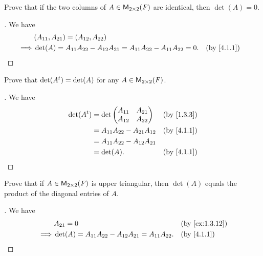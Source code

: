 \begin{ex}\label{ex:4.1.6}
  Prove that if the two columns of \(A \in \ms[2][2][\F]\) are identical, then \(\det(A) = 0\).
\end{ex}

\begin{proof}[]
  We have
  \begin{align*}
             & (A_{1 1}, A_{2 1}) = (A_{1 2}, A_{2 2})                                                              \\
    \implies & \det(A) = A_{1 1} A_{2 2} - A_{1 2} A_{2 1} = A_{1 1} A_{2 2} - A_{1 1} A_{2 2} = 0. &  & \by{4.1.1}
  \end{align*}
\end{proof}

\begin{ex}\label{ex:4.1.7}
  Prove that \(\det({A}^{t}) = \det(A)\) for any \(A \in \ms[2][2][\F]\).
\end{ex}

\begin{proof}[]
  We have
  \begin{align*}
    \det(\tp{A}) & = \det\begin{pmatrix}
                           A_{1 1} & A_{2 1} \\
                           A_{1 2} & A_{2 2}
                         \end{pmatrix}               &  & \by{1.3.3}   \\
                 & = A_{1 1} A_{2 2} - A_{2 1} A_{1 2} &  & \by{4.1.1} \\
                 & = A_{1 1} A_{2 2} - A_{1 2} A_{2 1}                 \\
                 & = \det(A).                          &  & \by{4.1.1}
  \end{align*}
\end{proof}

\begin{ex}\label{ex:4.1.8}
  Prove that if \(A \in \ms[2][2][\F]\) is upper triangular, then \(\det(A)\) equals the product of the diagonal entries of \(A\).
\end{ex}

\begin{proof}[]
  We have
  \begin{align*}
             & A_{2 1} = 0                                                    &  & \by{ex:1.3.12} \\
    \implies & \det(A) = A_{1 1} A_{2 2} - A_{1 2} A_{2 1} = A_{1 1} A_{2 2}. &  & \by{4.1.1}
  \end{align*}
\end{proof}

